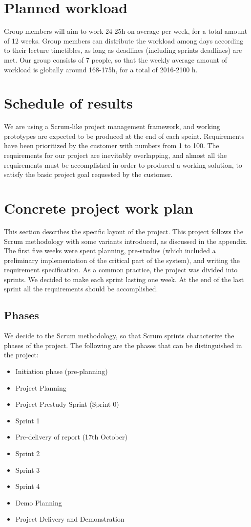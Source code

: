 \documentclass[11pt,a4paper,titlepage,oneside]{report}
\begin{document}
\section{Planned workload}
Group members will aim to work 24-25h on average per week, for a total amount of 12 weeks. Group members can distribute the workload among days according to their lecture timetibles, as long as deadlines (including sprints deadlines) are met.
Our group consists of 7 people, so that the weekly average amount of workload is globally around 168-175h, for a total of 2016-2100 h.

\section{Schedule of results}
We are using a Scrum-like project management framework, and working prototypes are expected to be produced at the end of each speint. Requirements have been prioritized by the customer with numbers from 1 to 100. The requirements for our project are inevitably overlapping, and almost all the requirements must be accomplished in order to produced a working solution, to satisfy the basic project goal requested by the customer.

\section{Concrete project work plan}
This section describes the specific layout of the project. This project follows the Scrum methodology with some variants introduced, as discussed in the appendix. The first five weeks were spent planning, pre-studies (which included a preliminary implementation of the critical part of the system), and writing the requirement specification. As a common practice, the project was divided into sprints. We decided to make each sprint lasting one week. At the end of the last sprint all the requirements should be accomplished.
\subsection{Phases}
We decide to the Scrum methodology, so that Scrum sprints characterize the phases of the project.
The following are the phases that can be distinguished in the project:
\begin{itemize}
\item Initiation phase (pre-planning)
\item Project Planning
\item Project Prestudy Sprint (Sprint 0)

\item Sprint 1
\item Pre-delivery of report (17th October)

\item Sprint 2
\item Sprint 3
\item Sprint 4

\item Demo Planning
\item Project Delivery and Demonstration
\end{itemize}
\end{document}
